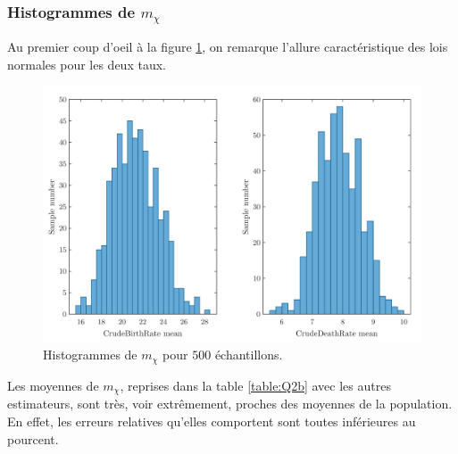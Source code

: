 \documentclass[a4paper, 12pt]{article}
\begin{document}
	\subsubsection{Histogrammes de $m_{\chi}$} \label{sec:Q2bi}
	Au premier coup d'oeil à la figure \ref{figure:Q2bi}, on remarque l'allure caractéristique des lois normales pour les deux taux. \par
	\begin{figure}[h!]
		\centering
		\includegraphics[scale=0.24]{resources/pdf/q2bi.pdf}
		\caption{Histogrammes de $m_{\chi}$ pour $500$ échantillons.}
		\label{figure:Q2bi}
	\end{figure}
	Les moyennes de $m_{\chi}$, reprises dans la table \ref{table:Q2b} avec les autres estimateurs, sont très, voir extrêmement, proches des moyennes de la population. En effet, les erreurs relatives qu'elles comportent sont toutes inférieures au pourcent.
\end{document}
